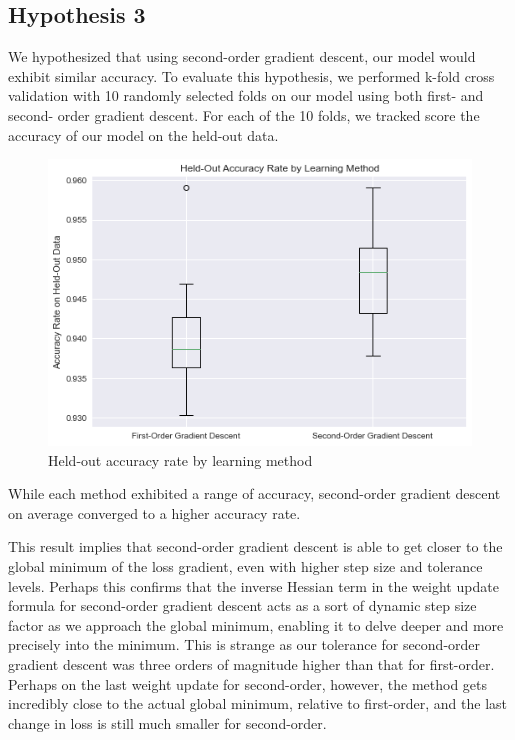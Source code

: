 \documentclass[11pt]{extarticle}
\begin{document}
\newpage

\subsection{Hypothesis 3}

We hypothesized that using second-order gradient descent, our model would exhibit similar accuracy. To evaluate this hypothesis, we performed k-fold cross validation with 10 randomly selected folds on our model using both first- and second- order gradient descent. For each of the 10 folds, we tracked score the accuracy of our model on the held-out data.

\begin{figure}[h!]
\begin{center}
    \includegraphics[scale=.7]{accuracy.png}
    \caption{Held-out accuracy rate by learning method}
    \label{fig:x}
\end{center}
\end{figure}

While each method exhibited a range of accuracy, second-order gradient descent on average converged to a higher accuracy rate.

This result implies that second-order gradient descent is able to get closer to the global minimum of the loss gradient, even with higher step size and tolerance levels. Perhaps this confirms that the inverse Hessian term in the weight update formula for second-order gradient descent acts as a sort of dynamic step size factor as we approach the global minimum, enabling it to delve deeper and more precisely into the minimum. This is strange as our tolerance for second-order gradient descent was three orders of magnitude higher than that for first-order. Perhaps on the last weight update for second-order, however, the method gets incredibly close to the actual global minimum, relative to first-order, and the last change in loss is still much smaller for second-order.
\end{document}
